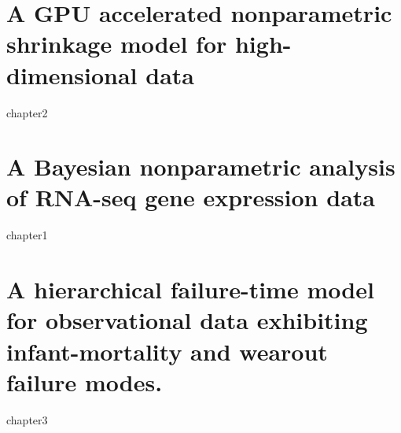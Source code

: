 \documentclass[11pt]{isuthesis}
\begin{document}


\tableofcontents
{} \cleardoublepage {}
{}
\listoftables
\cleardoublepage {} {}
\listoffigures

\newtoggle{thesis}
\toggletrue{thesis}

\cleardoublepage {}  %
\cleardoublepage {}         %



\newpage
{}



\chapter{A GPU accelerated nonparametric shrinkage
model for high-dimensional data}
{chapter2}

\chapter{A Bayesian nonparametric analysis of
RNA-seq gene expression data}
{chapter1}
% 

\chapter{A hierarchical failure-time model for observational data exhibiting infant-mortality and wearout failure modes.}
{chapter3}

\appendixtitle
\appendix


% 


\renewcommand{\bibname}{\centerline{BIBLIOGRAPHY}}
\unappendixtitle
\newpage
{}
{}

\end{document}
